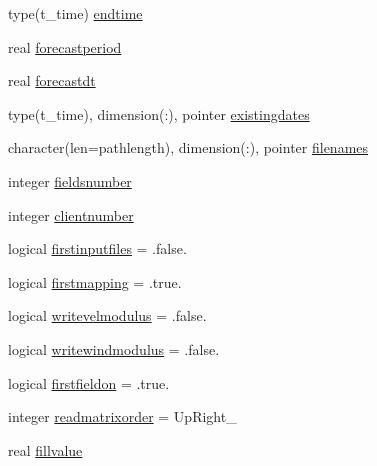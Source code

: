 \begin{DoxyCompactItemize}
\item 
type(t\+\_\+time) \mbox{\hyperlink{structmodulecowamaasciiwind_1_1t__cowamaasciiwind_ae2c8fc4c46ee3251735b31e77b94446a}{endtime}}
\item 
real \mbox{\hyperlink{structmodulecowamaasciiwind_1_1t__cowamaasciiwind_af3202daf1038c6dac5dbce0f0940506d}{forecastperiod}}
\item 
real \mbox{\hyperlink{structmodulecowamaasciiwind_1_1t__cowamaasciiwind_a8eed6609210515d707e104d18f05df92}{forecastdt}}
\item 
type(t\+\_\+time), dimension(\+:), pointer \mbox{\hyperlink{structmodulecowamaasciiwind_1_1t__cowamaasciiwind_ac80ae829d7648751ae32c302a67bffb5}{existingdates}}
\item 
character(len=pathlength), dimension(\+:), pointer \mbox{\hyperlink{structmodulecowamaasciiwind_1_1t__cowamaasciiwind_ac95c1390e4d65fcfb2bed1fd93ad8fb2}{filenames}}
\item 
integer \mbox{\hyperlink{structmodulecowamaasciiwind_1_1t__cowamaasciiwind_a1d86ffe055e14bef9c1fb613bb78a561}{fieldsnumber}}
\item 
integer \mbox{\hyperlink{structmodulecowamaasciiwind_1_1t__cowamaasciiwind_a5afff8a3c199ec12eec779775228a30f}{clientnumber}}
\item 
logical \mbox{\hyperlink{structmodulecowamaasciiwind_1_1t__cowamaasciiwind_ac9ad668c751eb4b9569308e97a92faa3}{firstinputfiles}} = .false.
\item 
logical \mbox{\hyperlink{structmodulecowamaasciiwind_1_1t__cowamaasciiwind_a9587211f52e048b5d7af62e853065e01}{firstmapping}} = .true.
\item 
logical \mbox{\hyperlink{structmodulecowamaasciiwind_1_1t__cowamaasciiwind_aeae654f269a307839382373ce9b5ae43}{writevelmodulus}} = .false.
\item 
logical \mbox{\hyperlink{structmodulecowamaasciiwind_1_1t__cowamaasciiwind_acf686b4f700cd9e82e30ce7d72ef8fac}{writewindmodulus}} = .false.
\item 
logical \mbox{\hyperlink{structmodulecowamaasciiwind_1_1t__cowamaasciiwind_a3b7e2bc0bf3e3150189c05fecbf3459a}{firstfieldon}} = .true.
\item 
integer \mbox{\hyperlink{structmodulecowamaasciiwind_1_1t__cowamaasciiwind_a023991d4ca0e9c037c82f4358a179f15}{readmatrixorder}} = Up\+Right\+\_\+
\item 
real \mbox{\hyperlink{structmodulecowamaasciiwind_1_1t__cowamaasciiwind_a9b090631d4da9fb3d65ec9a359e5b470}{fillvalue}}
\item 

\end{DoxyCompactItemize}

